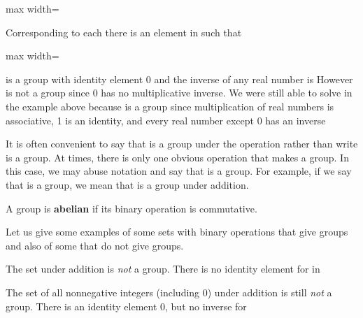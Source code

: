 \documentclass[11pt,oneside]{article}
\begin{document}
\begin{BookBody}
\begin{center}\begin{adjustbox}{max width=\linewidth}\end{adjustbox}\end{center}

 Corresponding to each  there is an element  in  such that

\begin{center}\begin{adjustbox}{max width=\linewidth}\end{adjustbox}\end{center} \BookEnd{\blacksquare}

  is a group with identity element 0 and the inverse of any real number  is  However is not a group since 0 has no multiplicative inverse. We were still able to solve  in the example above because  is a group since multiplication of real numbers is associative, 1 is an identity, and every real number except 0 has an inverse\BookEnd{\blacktriangle}

It is often convenient to say that  is a group under the operation \BookInline{\ast } rather than write  is a group. At times, there is only one obvious operation that makes  a group. In this case, we may abuse notation and say that  is a group. For example, if we say that  is a group, we mean that  is a group under addition.

 A group  is\textbf{ abelian} if its binary operation is commutative. \BookEnd{\blacksquare}

Let us give some examples of some sets with binary operations that give groups and also of some that do not give groups.

 The set  under addition is\textit{ not} a group. There is no identity element for \BookInline{+ } in \BookEnd{\blacktriangle}

 The set of all nonnegative integers (including 0) under addition is still\textit{ not} a group. There is an identity element 0, but no inverse for \BookEnd{\blacktriangle}

\end{BookBody}
\end{document}
